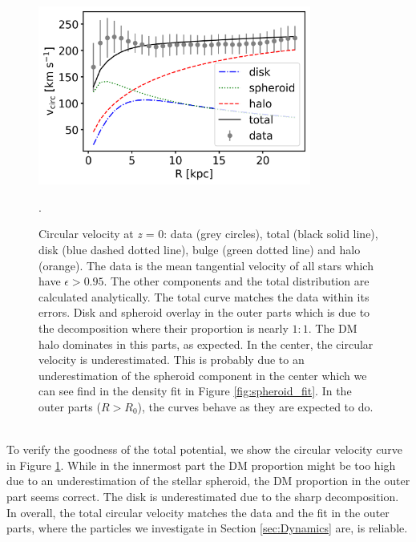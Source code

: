 \begin{figure}[htbp]
\captionsetup{format=plain}
\centering
\includegraphics[width=0.8\textwidth]{plots/Auriga/best_fit_circular_velocity_via_formula_snap_127.png}
\caption{Circular velocity at \textit{z} = 0: data (grey circles), total (black solid line), disk (blue dashed dotted line), bulge (green dotted line) and halo (orange). The data is the mean tangential velocity of all stars which have $\epsilon > 0.95$. The other components and the total distribution are calculated analytically. The total curve matches the data within its errors. Disk and spheroid overlay in the outer parts which is due to the decomposition where their proportion is nearly $1:1$. The \ac{DM} halo dominates in this parts, as expected. In the center, the circular velocity is underestimated. This is probably due to an underestimation of the spheroid component in the center which we can see find in the density fit in Figure \ref{fig:spheroid_fit}. In the outer parts ($R>R_0$), the curves behave as they are expected to do.}. \label{fig:circ_vel_fit}
\end{figure}
\\To verify the goodness of the total potential, we show the circular velocity curve in Figure \ref{fig:circ_vel_fit}. While in the innermost part the \ac{DM} proportion might be too high due to an underestimation of the stellar spheroid, the \ac{DM} proportion in the outer part seems correct. The disk is underestimated due to the sharp decomposition. In overall, the total circular velocity matches the data and the fit in the outer parts, where the particles we investigate in Section \ref{sec:Dynamics} are, is reliable.  

